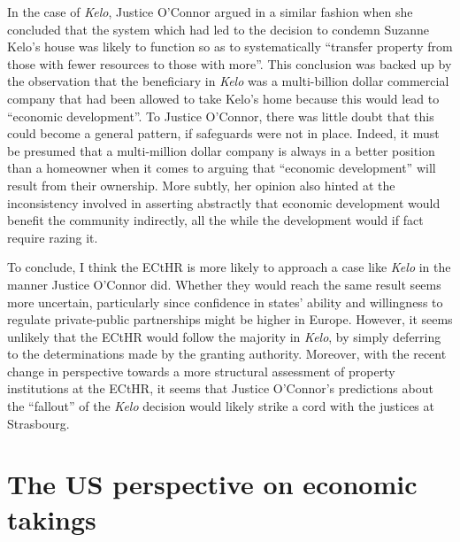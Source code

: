 \documentclass[12pt,a4paper]{book} %
\begin{document}
In the case of {\it Kelo}, Justice O'Connor argued in  a similar fashion when she concluded that the system which had led to the decision to condemn Suzanne Kelo's house was likely to function so as to systematically ``transfer property from those with fewer resources to those with more''. This conclusion was backed up by the observation that the beneficiary in {\it Kelo} was a multi-billion dollar commercial company that had been allowed to take Kelo's home because this would lead to ``economic development''. To Justice O'Connor, there was little doubt that this could become a general pattern, if safeguards were not in place. Indeed, it must be presumed that a multi-million dollar company is always in a better position than a homeowner when it comes to arguing that  ``economic development'' will result from their ownership. More subtly, her opinion also hinted at the inconsistency involved in asserting abstractly that economic development would benefit the community indirectly, all the while the development would if fact require razing it.

To conclude, I think the ECtHR is more likely to approach a case like {\it Kelo} in the manner Justice O'Connor did. Whether they would reach the same result seems more uncertain, particularly since confidence in states' ability and willingness to regulate private-public partnerships might be higher in Europe. However, it seems unlikely that the ECtHR would follow the majority in {\it Kelo}, by simply deferring to the determinations made by the granting authority. Moreover, with the recent change in perspective towards a more structural assessment of property institutions at the ECtHR, it seems that Justice O'Connor's predictions about the ``fallout'' of the {\it Kelo} decision would likely strike a cord with the justices at Strasbourg. 

\section{The US perspective on economic takings}\label{sec:us}
\end{document}
